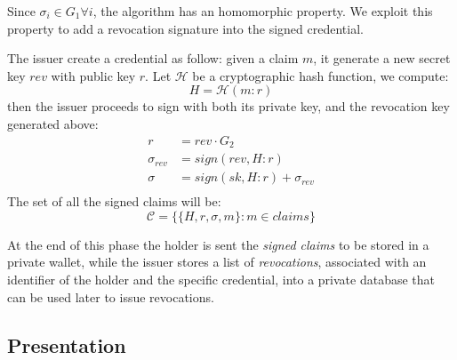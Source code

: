 Since $\sigma_i\in G_1 \forall i$, the algorithm has an homomorphic
property. We exploit this property to add a revocation signature into
the signed credential.

The issuer create a credential as follow: given a claim $m$, it
generate a new secret key $rev$ with public key $r$. Let $\mathcal{H}$
be a cryptographic hash function, we compute:
\begin{equation*}
    H = \mathcal{H}(m : r)
\end{equation*}
then the issuer proceeds to sign with both its private key, and the
revocation key generated above:
\begin{equation*}\label{rev_agg}
    \begin{split}
        r &= rev \cdot G_2 \\
        \sigma_{rev} &= sign(rev, H : r)\\
        \sigma &= sign(sk, H : r) + \sigma_{rev}\\
   \end{split}
\end{equation*}
The set of all the signed claims will be:
\begin{equation*}
   \mathcal{C} = \big\{ \{H, r, \sigma, m \} : m\in claims  \big\}
\end{equation*}

At the end of this phase the holder is sent the \textit{signed claims}
to be stored in a private wallet, while the issuer stores a list of
\textit{revocations}, associated with an identifier of the holder and
the specific credential, into a private database that can be used
later to issue revocations.



\subsection{Presentation} \label{presentation}

